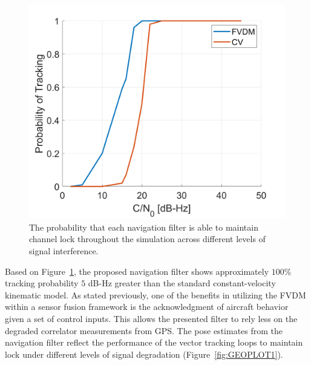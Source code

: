 \begin{figure}[!ht]
    \centering
    \includegraphics[width=0.5\linewidth]{Figures/straight/trackingprobstraight.png}
    \caption{The probability that each navigation filter is able to maintain channel lock throughout the simulation across different levels of signal interference.}\label{fig:trackingprobability1}
\end{figure}

Based on Figure~\ref{fig:trackingprobability1}, the proposed navigation filter shows approximately \(100\% \) tracking probability \(5\) dB-Hz greater than the standard constant-velocity kinematic model. As stated previously, one of the benefits in utilizing the FVDM within a sensor fusion framework is the acknowledgment of aircraft behavior given a set of control inputs. This allows the presented filter to rely less on the degraded correlator measurements from GPS\@. The pose estimates from the navigation filter reflect the performance of the vector tracking loops to maintain lock under different levels of signal degradation (Figure~\ref{fig:GEOPLOT1}).

